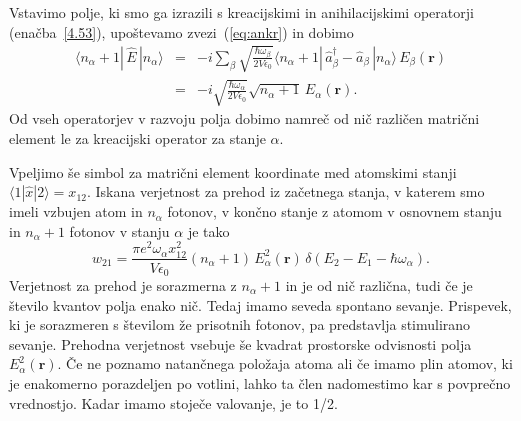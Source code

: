 Vstavimo polje, ki smo ga izrazili s kreacijskimi in anihilacijskimi operatorji (enačba~\ref{4.53}),
upoštevamo zvezi~(\ref{eq:ankr}) in dobimo
\begin{eqnarray}
\langle n_{\alpha}+1|\, \hat{E}\,|n_{\alpha}\rangle & = 
& -i\sum_{\beta}\sqrt{\frac{\hbar\omega_{\beta}}{2V\epsilon_{0}}}
\langle n_{\alpha}+1|\,\hat{a}_{\beta}^{\dagger}-\hat{a}_{\beta}\,|n_{\alpha}\rangle\, 
E_{\beta}(\mathbf{r})\nonumber \\
 & = & -i\sqrt{\frac{\hbar\omega_{\alpha}}{2V\epsilon_{0}}}
 \sqrt{n_{\alpha}+1}\, E_{\alpha}(\mathbf{r}).
\end{eqnarray}
Od vseh operatorjev v razvoju polja dobimo namreč od nič različen matrični
element le za kreacijski operator za stanje $\alpha$.


Vpeljimo še simbol za matrični element koordinate med 
atomskimi stanji $\langle1|\hat{x}|2\rangle=x_{12}$. Iskana verjetnost za prehod iz 
začetnega stanja, v katerem smo imeli vzbujen atom in $n_{\alpha}$ fotonov, v končno
stanje z atomom v osnovnem stanju in $n_{\alpha}+1$ fotonov v stanju $\alpha$ je tako
\begin{equation}
w_{21}=\frac{\pi e^{2}\omega_{\alpha}x_{12}^{2}}{V\epsilon_{0}}
(n_{\alpha}+1)\,E_{\alpha}^{2}(\mathbf{r})\,\delta(E_{2}-E_{1}-\hbar\omega_{\alpha}).
\label{4.56}
\end{equation}
Verjetnost za prehod je sorazmerna z $n_{\alpha}+1$ in je od nič
različna, tudi če je število kvantov polja enako nič. Tedaj imamo seveda
spontano sevanje. Prispevek, ki je 
sorazmeren s številom že prisotnih fotonov, pa predstavlja stimulirano 
sevanje. Prehodna verjetnost vsebuje
še kvadrat prostorske odvisnosti polja $E_{\alpha}^{2}(\mathbf{r})$.
Če ne poznamo natančnega položaja atoma ali če imamo plin atomov, ki je enakomerno
porazdeljen po votlini, lahko ta člen nadomestimo kar s povprečno vrednostjo.
Kadar imamo stoječe valovanje, je to 1/2.


